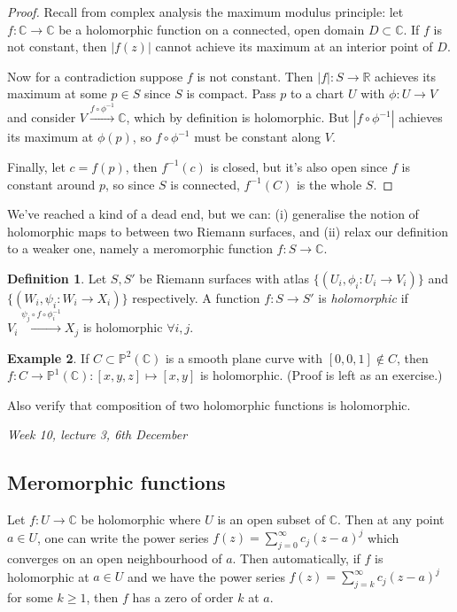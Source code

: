 \documentclass{article}
\newcommand{\R}{\mathbb{R}}
\newcommand{\C}{\mathbb{C}}
\newcommand{\p}{\mathbb{P}}
\theoremstyle{definition}
\newtheorem{defn}{Definition}[subsection]
\newtheorem{example}[defn]{Example}
\begin{document}
\begin{proof}
Recall from complex analysis the maximum modulus principle: let $f:\C\rightarrow\C$ be a holomorphic function on a connected, open domain $D\subset\C$. If $f$ is not constant, then $|f(z)|$ cannot achieve its maximum at an interior point of $D$.

Now for a contradiction suppose $f$ is not constant. Then $|f|:S\rightarrow\R$ achieves its maximum at some $p\in S$ since $S$ is compact. Pass $p$ to a chart $U$ with $\phi:U\rightarrow V$ and consider $V\xrightarrow{f\circ\phi^{-1}}\C$, which by definition is holomorphic. But $|f\circ\phi^{-1}|$ achieves its maximum at $\phi(p)$, so $f\circ\phi^{-1}$ must be constant along $V$.

Finally, let $c=f(p)$, then $f^{-1}(c)$ is closed, but it's also open since $f$ is constant around $p$, so since $S$ is connected, $f^{-1}(C)$ is the whole $S$.
\end{proof}

We've reached a kind of a dead end, but we can: (i) generalise the notion of holomorphic maps to between two Riemann surfaces, and (ii) relax our definition to a weaker one, namely a meromorphic function $f:S\rightarrow\C$.

\begin{defn}
Let $S,S'$ be Riemann surfaces with atlas $\{(U_i,\phi_i:U_i\rightarrow V_i)\}$ and $\{(W_i,\psi_i:W_i\rightarrow X_i)\}$ respectively. A function $f:S\rightarrow S'$ is \textit{holomorphic} if $V_i\xrightarrow{\psi_j\circ f\circ\phi_i^{-1}}X_j$ is holomorphic $\forall i,j$.
\end{defn}

\begin{example}
If $C\subset\p^2(\C)$ is a smooth plane curve with $[0,0,1]\notin C$, then $f:C\rightarrow\p^1(\C):[x,y,z]\mapsto[x,y]$ is holomorphic. (Proof is left as an exercise.)

Also verify that composition of two holomorphic functions is holomorphic.
\end{example}

\begin{flushright}
\textit{Week 10, lecture 3, 6th December}
\end{flushright}

\subsection{Meromorphic functions}
Let $f:U\rightarrow\C$ be holomorphic where $U$ is an open subset of $\C$. Then at any point $a\in U$, one can write the power series $f(z)=\sum_{j=0}^\infty c_j(z-a)^j$ which converges on an open neighbourhood of $a$. Then automatically, if $f$ is holomorphic at $a\in U$ and we have the power series $f(z)=\sum_{j=k}^\infty c_j(z-a)^j$ for some $k\geq 1$, then $f$ has a zero of order $k$ at $a$.
\end{document}
